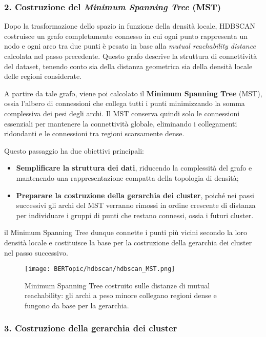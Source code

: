 \subsubsection*{2. Costruzione del \textit{Minimum Spanning Tree} (MST)}

Dopo la trasformazione dello spazio in funzione della densità locale, HDBSCAN costruisce un grafo completamente connesso in cui ogni punto rappresenta un nodo e ogni arco tra due punti è pesato in base alla \textit{mutual reachability distance} calcolata nel passo precedente. 
Questo grafo descrive la struttura di connettività del dataset, tenendo conto sia della distanza geometrica sia della densità locale delle regioni considerate.

A partire da tale grafo, viene poi calcolato il \textbf{Minimum Spanning Tree} (MST), ossia l'albero di connessioni che collega tutti i punti minimizzando la somma complessiva dei pesi degli archi. 
Il MST conserva quindi solo le connessioni essenziali per mantenere la connettività globale, eliminando i collegamenti ridondanti e le connessioni tra regioni scarsamente dense.

Questo passaggio ha due obiettivi principali:
\begin{itemize}
    \item \textbf{Semplificare la struttura dei dati}, riducendo la complessità del grafo e mantenendo una rappresentazione compatta della topologia di densità;
    \item \textbf{Preparare la costruzione della gerarchia dei cluster}, poiché nei passi successivi gli archi del MST verranno rimossi in ordine crescente di distanza per individuare i gruppi di punti che restano connessi, ossia i futuri cluster.
\end{itemize}

il Minimum Spanning Tree dunque connette i punti più vicini secondo la loro densità locale e costituisce la base per la costruzione della gerarchia dei cluster nel passo successivo.

\begin{figure}[H]
\centering
\texttt{[image: BERTopic/hdbscan/hdbscan\_MST.png]}
\caption{Minimum Spanning Tree costruito sulle distanze di mutual reachability: gli archi a peso minore collegano regioni dense e fungono da base per la gerarchia.}
\label{fig:hdbscan-mst}
\end{figure}

\subsubsection*{3. Costruzione della gerarchia dei cluster}

